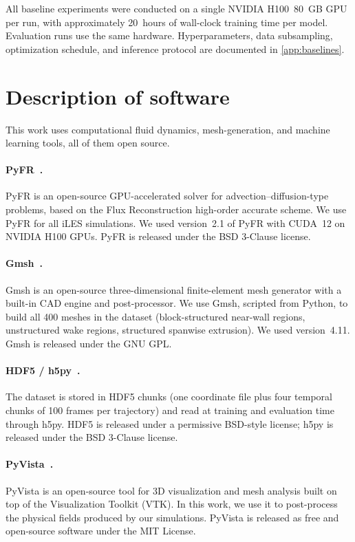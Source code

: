 \documentclass{article}
\begin{document}
All baseline experiments were conducted on a single NVIDIA H100~80~GB GPU per run, with approximately 20~hours of wall-clock training time per model. Evaluation runs use the same hardware. Hyperparameters, data subsampling, optimization schedule, and inference protocol are documented in \autoref{app:baselines}.

 
\section{Description of software} \label{app:software}   
This work uses computational fluid dynamics, mesh-generation, and machine learning tools, all of them open source.
      
\paragraph{PyFR~\citep{WITHERDEN20143028}.} PyFR is an open-source GPU-accelerated solver for advection--diffusion-type problems, based on the Flux Reconstruction high-order accurate scheme. We use PyFR for all iLES simulations. We used version~\textcolor{revcolor}{2.1} of PyFR with CUDA~12 on NVIDIA H100 GPUs. PyFR is released under the BSD 3-Clause license. 

\paragraph{Gmsh~\citep{GMSH}.} Gmsh is an open-source three-dimensional finite-element mesh generator with a built-in CAD engine and post-processor. We use Gmsh, scripted from Python, to build all \textcolor{revcolor}{400} meshes in the dataset (block-structured near-wall regions, unstructured wake regions, structured spanwise extrusion). We used version~4.11. Gmsh is released under the GNU GPL.   

\paragraph{HDF5 / h5py~\citep{hdf5}.} The dataset is stored in HDF5 chunks (one coordinate file plus four temporal chunks of 100 frames per trajectory) and read at training and evaluation time through h5py. HDF5 is released under a permissive BSD-style license; h5py is released under the BSD 3-Clause license.                              
\paragraph{PyVista~\citep{pyvista}.} PyVista is an open-source tool for 3D visualization and mesh analysis built on top of the Visualization Toolkit (VTK). In this work, we use it to post-process the physical fields produced by our simulations. PyVista is released as free and open-source software under the MIT License.
  
\end{document}
